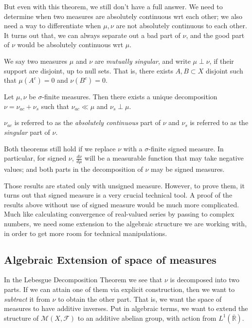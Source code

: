 But even with this theorem, we still don't have a full answer. We need to determine when two measures are absolutely continuous wrt each other; we also need a way to differentiate when $\mu, \nu$ are not absolutely continuous to each other. It turns out that, we can always separate out a bad part of $\nu$, and the good part of $\nu$ would be absolutely continuous wrt $\mu$.

\begin{definition}
	We say two measures $\mu$ and $\nu$ are \textit{mutually singular}, and write $\mu \perp \nu$, if their support are disjoint, up to null sets. That is, there exists $A, B \subset X$ disjoint such that $\mu(A^c) = 0$ and $\nu(B^c) = 0$.
\end{definition}
\begin{theorem}
	Let $\mu, \nu$ be $\sigma$-finite measures. Then there exists a unique decomposition $\nu = \nu_{ac} + \nu_s$ such that $\nu_{ac} \ll\mu$ and $\nu_s \perp \mu$.

	$\nu_{ac}$ is referred to as the \textit{absolutely continuous} part of $\nu$ and $\nu_{s}$ is referred to as the \textit{singular} part of $\nu$.
\end{theorem}
\begin{remark}
	Both theorems still hold if we replace $\nu$ with a $\sigma$-finite signed measure. In particular, for signed $\nu$, $\frac{d \nu}{d \mu}$ will be a measurable function that may take negative values; and both parts in the decomposition of $\nu$ may be signed measures.
\end{remark}

Those results are stated only with unsigned measure. However, to prove them, it turns out that signed measure is a very crucial technical tool. A proof of the results above without use of signed measure would be much more complicated. Much like calculating convergence of real-valued series by passing to complex numbers, we need some extension to the algebraic structure we are working with, in order to get more room for technical manipulations.


\subsection{Algebraic Extension of space of measures}

In the Lebesgue Decomposition Theorem we see that $\nu$ is decomposed into two parts. If we can attain one of them via explicit construction, then we want to \textit{subtract} it from $\nu$ to obtain the other part. That is, we want the space of measures to have additive inverses. Put in algebraic terms, we want to extend the structure of $\mathcal{M}(X, \mathcal{F})$ to an additive abelian group, with action from $L^1\left( \overline{\mathbb{R}}  \right) $. 

